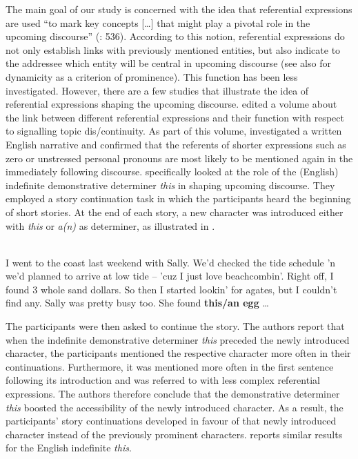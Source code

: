 \documentclass[output=paper,colorlinks,citecolor=brown]{langscibook}
\begin{document}
The main goal of our study is concerned with the idea that referential expressions are used “to mark key concepts […] that might play a pivotal role in the upcoming discourse” (\citealt{GernsbacherShroyer1989}: 536). According to this notion, referential expressions do not only establish links with previously mentioned entities, but also indicate to the addressee which entity will be central in upcoming discourse (see also \citealt{VonHeusingerSchumacher2019} for dynamicity as a criterion of prominence). This function has been less investigated. However, there are a few studies that illustrate the idea of referential expressions shaping the upcoming discourse. \citet{Givón1983} edited a volume about the link between different referential expressions and their function with respect to signalling topic dis/continuity. As part of this volume, \citet{Brown1983} investigated a written English narrative and confirmed that the referents of shorter expressions such as zero or unstressed personal pronouns are most likely to be mentioned again in the immediately following discourse. \citet{GernsbacherShroyer1989} specifically looked at the role of the (English) indefinite demonstrative determiner \textit{this} in shaping upcoming discourse. They employed a story continuation task in which the participants heard the beginning of short stories. At the end of each story, a new character was introduced either with \textit{this} or \textit{a(n)} as determiner, as illustrated in .

\ea\label{ex:fuchs:1} \citep[537]{GernsbacherShroyer1989}\\
  I went to the coast last weekend with Sally. We’d checked the tide schedule ’n we’d planned to arrive at low tide – ’cuz I just love beachcombin’. Right off, I found 3 whole sand dollars. So then I started lookin’ for agates, but I couldn’t find any. Sally was pretty busy too. She found \textbf{this/an egg} …\\
\z

The participants were then asked to continue the story. The authors report that when the indefinite demonstrative determiner \textit{this} preceded the newly introduced character, the participants mentioned the respective character more often in their continuations. Furthermore, it was mentioned more often in the first sentence following its introduction and was referred to with less complex referential expressions. The authors therefore conclude that the demonstrative determiner \textit{this} boosted the accessibility of the newly introduced character. As a result, the participants’ story continuations developed in favour of that newly introduced character instead of the previously prominent characters. \citet{Chiriacescu2011} reports similar results for the English indefinite \textit{this}. 
\end{document}

